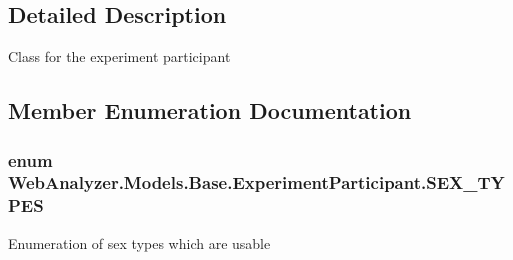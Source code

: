 \subsection{Detailed Description}
Class for the experiment participant 



\subsection{Member Enumeration Documentation}
\hypertarget{class_web_analyzer_1_1_models_1_1_base_1_1_experiment_participant_a38a0a0bc1d3ad083204da1de1fb93754}{}
\subsubsection[{S\+E\+X\+\_\+\+T\+Y\+P\+E\+S}]{\setlength{\rightskip}{0pt plus 5cm}enum {\bf Web\+Analyzer.\+Models.\+Base.\+Experiment\+Participant.\+S\+E\+X\+\_\+\+T\+Y\+P\+E\+S}\hspace{0.3cm}{\ttfamily [strong]}}\label{class_web_analyzer_1_1_models_1_1_base_1_1_experiment_participant_a38a0a0bc1d3ad083204da1de1fb93754}


Enumeration of sex types which are usable 

